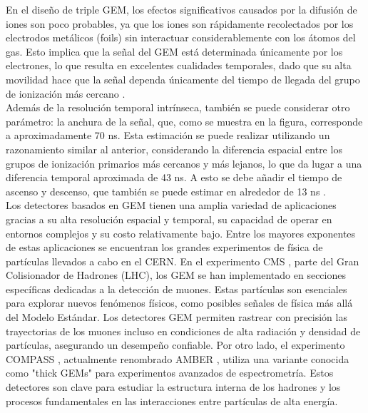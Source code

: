 \documentclass{report}
\begin{document}
\noindent En el diseño de triple GEM, los efectos significativos causados por la difusión de iones son poco probables, ya que los iones son rápidamente recolectados por los electrodos metálicos (foils) sin interactuar considerablemente con los átomos del gas. Esto implica que la señal del GEM está determinada únicamente por los electrones, lo que resulta en excelentes cualidades temporales, dado que su alta movilidad hace que la señal dependa únicamente del tiempo de llegada del grupo de ionización más cercano \cite{mocellin2021performance}.\\

\noindent Además de la resolución temporal intrínseca, también se puede considerar otro parámetro: la anchura de la señal, que, como se muestra en la figura, corresponde a aproximadamente 70 ns. Esta estimación se puede realizar utilizando un razonamiento similar al anterior, considerando la diferencia espacial entre los grupos de ionización primarios más cercanos y más lejanos, lo que da lugar a una diferencia temporal aproximada de 43 ns. A esto se debe añadir el tiempo de ascenso y descenso, que también se puede estimar en alrededor de 13 ns \cite{mocellin2021performance}.\\

\noindent Los detectores basados en GEM tienen una amplia variedad de aplicaciones gracias a su alta resolución espacial y temporal, su capacidad de operar en entornos complejos y su costo relativamente bajo. Entre los mayores exponentes de estas aplicaciones se encuentran los grandes experimentos de física de partículas llevados a cabo en el CERN. En el experimento CMS \cite{abbaneo2013gem} \cite{colaleo2015cms}, parte del Gran Colisionador de Hadrones (LHC), los GEM se han implementado en secciones específicas dedicadas a la detección de muones. Estas partículas son esenciales para explorar nuevos fenómenos físicos, como posibles señales de física más allá del Modelo Estándar. Los detectores GEM permiten rastrear con precisión las trayectorias de los muones incluso en condiciones de alta radiación y densidad de partículas, asegurando un desempeño confiable. Por otro lado, el experimento COMPASS \cite{ketzer2004performance}, actualmente renombrado AMBER \cite{alexeev2023development}, utiliza una variante conocida como "thick GEMs" para experimentos avanzados de espectrometría. Estos detectores son clave para estudiar la estructura interna de los hadrones y los procesos fundamentales en las interacciones entre partículas de alta energía.\\
\end{document}
